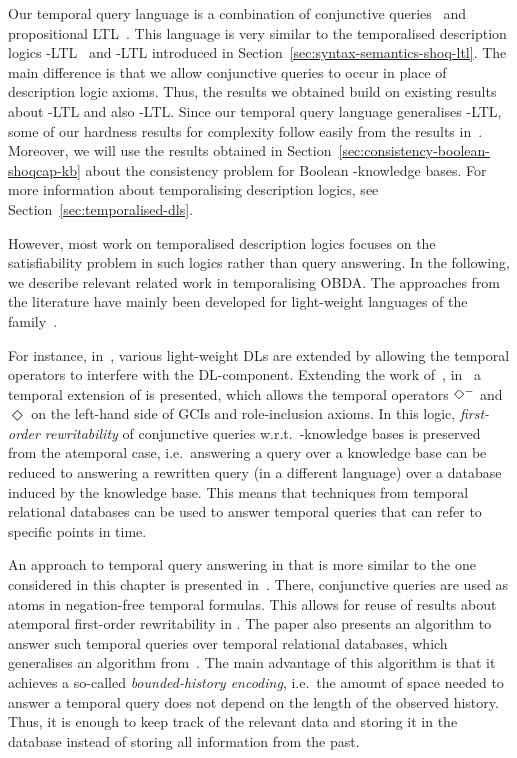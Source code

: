 Our temporal query language is a combination of conjunctive
queries~\cite{AbHV-95} and propositional LTL~\cite{Pnu-FOCS77}.  This language
is very similar to the temporalised description logics
\ALC-LTL~\cite{BaGL-ToCL12} and \SHOQ-LTL introduced in
Section~\ref{sec:syntax-semantics-shoq-ltl}.  The main difference is that we
allow conjunctive queries to occur in place of description logic axioms.
%
Thus, the results we obtained build on existing results about \ALC-LTL and also
\SHOQ-LTL\@.  Since our temporal query language generalises \ALC-LTL, some of
our hardness results for complexity follow easily from the results
in~\cite{BaGL-ToCL12}.  Moreover, we will use the results obtained in
Section~\ref{sec:consistency-boolean-shoqcap-kb} about the consistency problem
for Boolean \SHOQcap-knowledge bases.  For more information about temporalising
description logics, see Section~\ref{sec:temporalised-dls}.

However, most work on temporalised description logics focuses on the
satisfiability problem in such logics rather than query answering.  In the
following, we describe relevant related work in temporalising OBDA\@.  The
approaches from the literature have mainly been developed for light-weight
languages of the \DLLite family~\cite{CDL+-RW09}.

For instance, in~\cite{AKL+-TIME07}, various light-weight DLs are extended by
allowing the temporal operators to interfere with the DL-component.  Extending
the work of~\cite{AKL+-TIME07}, in~\cite{AKW+-IJCAI13} a temporal extension of
\DLLite is presented, which allows the temporal operators $\Diamondm$ and
$\Diamond$ on the left-hand side of GCIs and role-inclusion axioms.  In this
logic, \emph{first-order rewritability} of conjunctive queries w.r.t.\
\DLLite-knowledge bases is preserved from the atemporal case, i.e.~answering a
query over a knowledge base can be reduced to answering a rewritten query (in a
different language) over a database induced by the knowledge base.  This means
that techniques from temporal relational databases can be used to answer
temporal queries that can refer to specific points in time.

An approach to temporal query answering in \DLLite that is more similar to the
one considered in this chapter is presented
in~\cite{BoLT-FroCoS13,BoLT-DL13,BoLT-LTCS-13-05}.  There, conjunctive queries
are used as atoms in negation-free temporal formulas.  This allows for reuse of
results about atemporal first-order rewritability in \DLLite.  The paper also
presents an algorithm to answer such temporal queries over temporal relational
databases, which generalises an algorithm from~\cite{Chom-ToDS95,ChTo-05}.  The
main advantage of this algorithm is that it achieves a so-called
\emph{bounded-history encoding}, i.e.~the amount of space needed to answer a
temporal query does not depend on the length of the observed history.  Thus, it
is enough to keep track of the relevant data and storing it in the database
instead of storing all information from the past.

